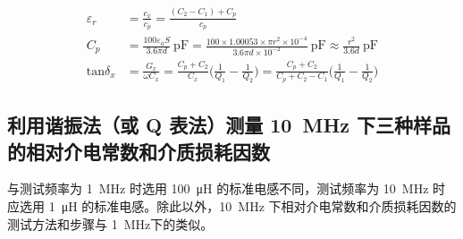    \begin{align}
        \varepsilon_r&=\frac{c_x}{c_p}=\frac{(C_2-C_1)+C_p}{c_p}\label{eq18}\\
        C_p&=\frac{100\varepsilon_aS}{3.6\pi d}\:\unit{\pico\farad}=\frac{100\times1.00053\times\pi r^2\times10^{-4}}{3.6\pi d\times10^{-2}}\:\unit{\pico\farad}\approx\frac{r^2}{3.6d}\:\unit{\pico\farad}\label{eq19}\\
        \mathrm{tan}\delta_{x}&=\frac{G_{x}}{\omega C_{x}}=\frac{C_{p}+C_{2}}{C_{x}}\biggl(\frac{1}{Q_{1}}-\frac{1}{Q_{2}}\biggr)=\frac{C_{p}+C_{2}}{C_{p}+C_{2}-C_{1}}\biggl(\frac{1}{Q_{1}}-\frac{1}{Q_{2}}\biggr)\label{eq22}
    \end{align}
    \subsection{利用谐振法（或 Q 表法）测量 \SI{10}{\mega\hertz} 下三种样品的相对介电常数和介质损耗因数}
        与测试频率为 \SI{1}{\mega\hertz} 时选用 \SI{100}{\micro\henry} 的标准电感不同，测试频率为 \SI{10}{\mega\hertz} 时应选用 \SI{1}{\micro\henry} 的标准电感。除此以外，\SI{10}{\mega\hertz} 下相对介电常数和介质损耗因数的测试方法和步骤与 \SI{1}{\mega\hertz}下的类似。
